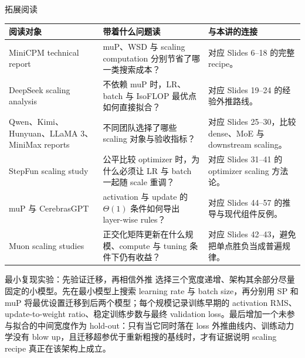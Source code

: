 \documentclass[a4paper]{article}
\begin{document}
\begin{knowledgebox}{拓展阅读}
\small
\begin{tabular}{L{0.24\textwidth}L{0.34\textwidth}L{0.32\textwidth}}
\toprule
阅读对象 & 带着什么问题读 & 与本讲的连接 \\
\midrule
MiniCPM technical report & muP、WSD 与 scaling computation 分别节省了哪一类搜索成本？ & 对应 Slides 6--18 的完整 recipe。 \\
DeepSeek scaling analysis & 不依赖 muP 时，LR、batch 与 IsoFLOP 最优点如何直接拟合？ & 对应 Slides 19--24 的经验外推路线。 \\
Qwen、Kimi、Hunyuan、LLaMA 3、MiniMax reports & 不同团队选择了哪些 scaling 对象与验收指标？ & 对应 Slides 25--30，比较 dense、MoE 与 downstream scaling。 \\
StepFun scaling study & 公平比较 optimizer 时，为什么必须让 LR 与 batch 一起随 scale 重调？ & 对应 Slides 31--41 的 optimizer scaling 方法论。 \\
muP 与 CerebrasGPT & activation 与 update 的 $\Theta(1)$ 条件如何导出 layer-wise rules？ & 对应 Slides 44--57 的推导与现代组件反例。 \\
Muon scaling studies & 正交化矩阵更新在什么规模、compute 与 tuning 条件下仍有收益？ & 对应 Slides 42--43，避免把单点胜负当成普遍规律。 \\
\bottomrule
\end{tabular}
\end{knowledgebox}

\begin{importantbox}{最小复现实验：先验证迁移，再相信外推}
选择三个宽度递增、架构其余部分尽量固定的小模型。先在最小模型上搜索 learning rate 与 batch size，再分别用 SP 和 muP 将最优设置迁移到后两个模型；每个规模记录训练早期的 activation RMS、update-to-weight ratio、稳定训练步数与最终 validation loss。最后增加一个未参与拟合的中间宽度作为 hold-out：只有当它同时落在 loss 外推曲线内、训练动力学没有 blow up，且迁移超参优于重新粗搜的基线时，才有证据说明 scaling recipe 真正在该架构上成立。
\end{importantbox}
\end{document}
